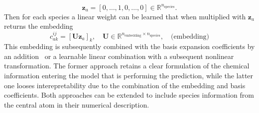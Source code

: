 \begin{equation}
  \mathbf{z}_a = [0,\ldots, 1, 0,\ldots, 0]\in\mathbb{R}^{n_\text{species}}.
\end{equation}
Then for each species a linear weight can be learned that when multiplied with $\mathbf{z}_a$ returns the embedding
\begin{equation}
  \label{eq:chemical_embedding}
  c^{ij}_{ak} = [\mathbf{U}\mathbf{z}_a]_k, \quad \mathbf{U}\in\mathbb{R}^{n_\text{embedding}\times n_\text{species}}, \quad \text{(embedding)}
\end{equation}
This embedding is subsequently combined with the basis expansion coefficients %
by an addition~\cite{schutt2018schnet} or a learnable linear combination with a subsequent nonlinear transformation.
The former approach retains a clear formulation of the chemical information entering the model that is performing the prediction, while the latter one looses interepretability due to the combination of the embedding and basis coefficients.
Both approaches can be extended to include species information from the central atom in their numerical description.

